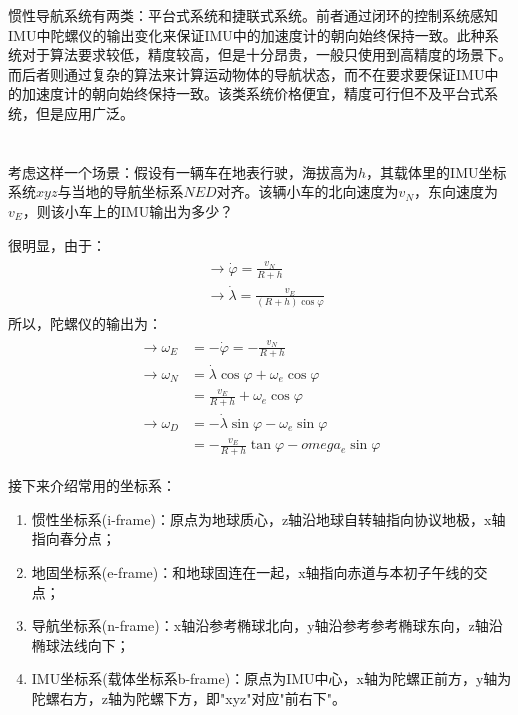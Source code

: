 \documentclass[12pt, twocolumn]{article}
\newcommand{\normf}{\kaishu}
\begin{document}
	惯性导航系统有两类：平台式系统和捷联式系统。前者通过闭环的控制系统感知IMU中陀螺仪的输出变化来保证IMU中的加速度计的朝向始终保持一致。此种系统对于算法要求较低，精度较高，但是十分昂贵，一般只使用到高精度的场景下。而后者则通过复杂的算法来计算运动物体的导航状态，而不在要求要保证IMU中的加速度计的朝向始终保持一致。该类系统价格便宜，精度可行但不及平台式系统，但是应用广泛。
	
	\section{\normf{惯性器件的误差和标定}}
	考虑这样一个场景：假设有一辆车在地表行驶，海拔高为$h$，其载体里的IMU坐标系统$xyz$与当地的导航坐标系$NED$对齐。该辆小车的北向速度为$v_N$，东向速度为$v_E$，则该小车上的IMU输出为多少？
	
	很明显，由于：
	\begin{eqnarray*}
		\begin{aligned}
			&\to\dot{\varphi}=\frac{v_N}{R+h}\\
			&\to\dot{\lambda}=\frac{v_E}{(R+h)\cos\varphi}
		\end{aligned}
	\end{eqnarray*}
	所以，陀螺仪的输出为：
	\begin{eqnarray*}
	\begin{aligned}
	\to \omega_E&=-\dot{\varphi}=-\frac{v_N}{R+h}\\
	\to\omega_N&=\dot{\lambda}\cos\varphi+\omega_e\cos\varphi\\
	&=\frac{v_E}{R+h}+\omega_e\cos\varphi\\
	\to\omega_D&=-\dot{\lambda}\sin\varphi-\omega_e\sin\varphi\\
	&=-\frac{v_E}{R+h}\tan\varphi-omega_e\sin\varphi
	\end{aligned}
	\end{eqnarray*}

	接下来介绍常用的坐标系：
	\begin{enumerate}
		\item 惯性坐标系(i-frame)：原点为地球质心，z轴沿地球自转轴指向协议地极，x轴指向春分点；
		\item 地固坐标系(e-frame)：和地球固连在一起，x轴指向赤道与本初子午线的交点；
		\item 导航坐标系(n-frame)：x轴沿参考椭球北向，y轴沿参考参考椭球东向，z轴沿椭球法线向下；
		\item IMU坐标系(载体坐标系b-frame)：原点为IMU中心，x轴为陀螺正前方，y轴为陀螺右方，z轴为陀螺下方，即"xyz"对应"前右下"。
		
	\end{enumerate}
\end{document}
